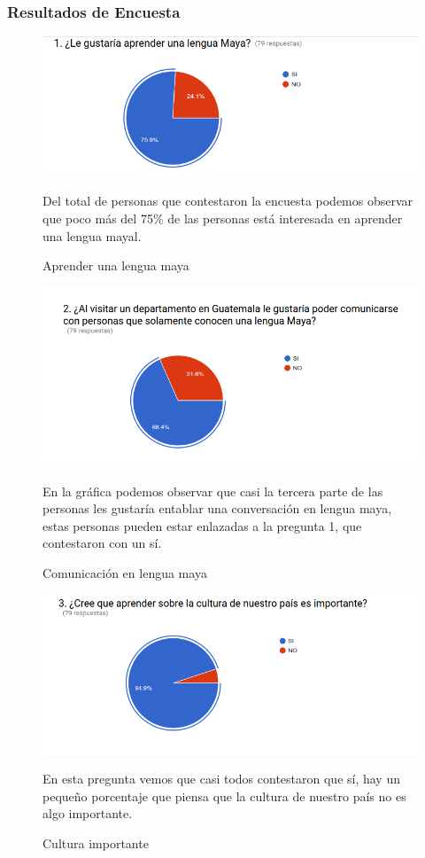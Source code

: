 \documentclass[a4paper,openright,11pt]{article}
\begin{document}
\subsubsection{Resultados de Encuesta}
\begin{figure}[H]
	\centering
	\includegraphics[width=1.0\textwidth]{e1}
	\caption{Aprender una lengua maya}
	\label{fig:e1}
	Del total de personas que contestaron la encuesta podemos observar que poco más del 75\% de las personas está interesada en aprender una lengua mayal.
\end{figure}
\begin{figure}[H]
	\centering
	\includegraphics[width=1.0\textwidth]{e2}
	\caption{Comunicación en lengua maya}
	\label{fig:e2}
	En la gráfica podemos observar que casi la tercera parte de las personas les gustaría entablar una conversación en lengua maya, estas personas pueden estar enlazadas a la pregunta 1, que contestaron con un sí.
\end{figure}
\begin{figure}
	\centering
	\includegraphics[width=1.0\textwidth]{e3}
	\caption{Cultura importante}
	\label{fig:e3}
	En esta pregunta vemos que casi todos contestaron que sí, hay un pequeño porcentaje que piensa que la cultura de nuestro país no es algo importante.
\end{figure}
\end{document}
